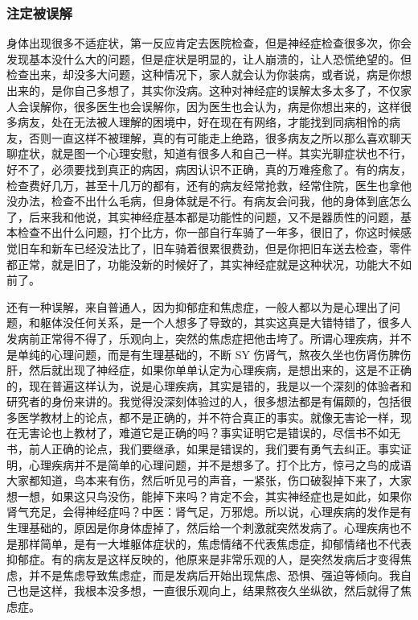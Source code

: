 \documentclass{ctexart}
\begin{document}
\subsubsection{注定被误解}

身体出现很多不适症状，第一反应肯定去医院检查，但是神经症检查很多次，你会发现基本没什么大的问题，但是症状是明显的，让人崩溃的，让人恐慌绝望的。但检查出来，却没多大问题，这种情况下，家人就会认为你装病，或者说，病是你想出来的，是你自己多想了，其实你没病。这种对神经症的误解太多太多了，不仅家人会误解你，很多医生也会误解你，因为医生也会认为，病是你想出来的，这样很多病友，处在无法被人理解的困境中，好在现在有网络，才能找到同病相怜的病友，否则一直这样不被理解，真的有可能走上绝路，很多病友之所以那么喜欢聊天聊症状，就是图一个心理安慰，知道有很多人和自己一样。其实光聊症状也不行，好不了，必须要找到真正的病因，病因认识不正确，真的万难痊愈了。有的病友，检查费好几万，甚至十几万的都有，还有的病友经常抢救，经常住院，医生也拿他没办法，检查不出什么毛病，但身体就是不行。有病友会问我，他的身体到底怎么了，后来我和他说，其实神经症基本都是功能性的问题，又不是器质性的问题，基本检查不出什么问题，打个比方，你一部自行车骑了一年多，很旧了，你这时候感觉旧车和新车已经没法比了，旧车骑着很累很费劲，但是你把旧车送去检查，零件都正常，就是旧了，功能没新的时候好了，其实神经症就是这种状况，功能大不如前了。

还有一种误解，来自普通人，因为抑郁症和焦虑症，一般人都以为是心理出了问题，和躯体没任何关系，是一个人想多了导致的，其实这真是大错特错了，很多人发病前正常得不得了，乐观向上，突然的焦虑症把他击垮了。所谓心理疾病，并不是单纯的心理问题，而是有生理基础的，不断 SY 伤肾气，熬夜久坐也伤肾伤脾伤肝，然后就出现了神经症，如果你单单认定为心理疾病，是想出来的，这是不正确的，现在普遍这样认为，说是心理疾病，其实是错的，我是以一个深刻的体验者和研究者的身份来讲的。我觉得没深刻体验过的人，很多想法都是有偏颇的，包括很多医学教材上的论点，都不是正确的，并不符合真正的事实。就像无害论一样，现在无害论也上教材了，难道它是正确的吗？事实证明它是错误的，尽信书不如无书，前人正确的论点，我们要继承，如果是错误的，我们要有勇气去纠正。事实证明，心理疾病并不是简单的心理问题，并不是想多了。打个比方，惊弓之鸟的成语大家都知道，鸟本来有伤，然后听见弓的声音，一紧张，伤口破裂掉下来了，大家想一想，如果这只鸟没伤，能掉下来吗？肯定不会，其实神经症也是如此，如果你肾气充足，会得神经症吗？中医：肾气足，万邪熄。所以说，心理疾病的发作是有生理基础的，原因是你身体虚掉了，然后给一个刺激就突然发病了。心理疾病也不是那样简单，是有一大堆躯体症状的，焦虑情绪不代表焦虑症，抑郁情绪也不代表抑郁症。有的病友是这样反映的，他原来是非常乐观的人，是突然发病后才变得焦虑，并不是焦虑导致焦虑症，而是发病后开始出现焦虑、恐惧、强迫等倾向。我自己也是这样，我根本没多想，一直很乐观向上，结果熬夜久坐纵欲，然后就得了焦虑症。
\end{document}
